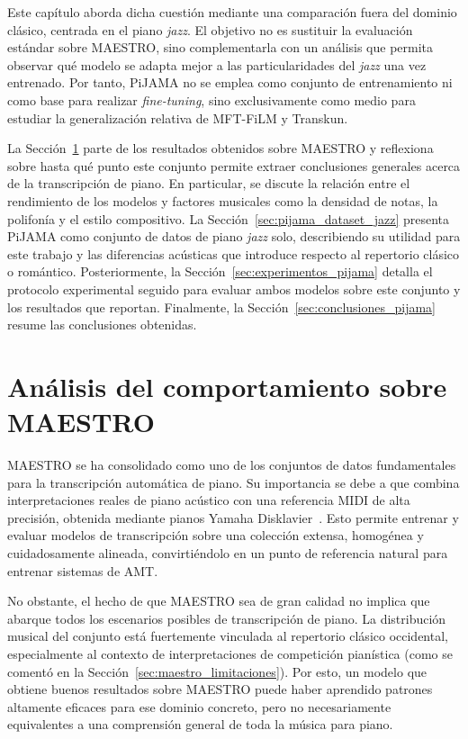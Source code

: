 \documentclass[11pt,spanish,listoffigures,listoftables]{tfgetsinf}
\begin{document}
Este capítulo aborda dicha cuestión mediante una comparación fuera del dominio
clásico, centrada en el piano \textit{jazz}. El objetivo no es sustituir la evaluación estándar
sobre MAESTRO, sino complementarla con un análisis que permita observar qué modelo
se adapta mejor a las particularidades del \textit{jazz} una vez entrenado. Por tanto, PiJAMA no
se emplea como conjunto de entrenamiento ni como base para realizar \textit{fine-tuning},
sino exclusivamente como medio para estudiar la generalización relativa de
MFT-FiLM y Transkun.

La Sección~\ref{sec:maestro_generalizacion_jazz} parte de los resultados obtenidos
sobre MAESTRO y reflexiona sobre hasta qué punto este conjunto permite extraer
conclusiones generales acerca de la transcripción de piano. En particular, se discute la
relación entre el rendimiento de los modelos y factores musicales como la densidad de
notas, la polifonía y el estilo compositivo. La Sección~\ref{sec:pijama_dataset_jazz}
presenta PiJAMA como conjunto de datos de piano \textit{jazz} solo, describiendo su utilidad
para este trabajo y las diferencias acústicas que introduce respecto al repertorio clásico
o romántico. Posteriormente, la Sección~\ref{sec:experimentos_pijama} detalla el
protocolo experimental seguido para evaluar ambos modelos sobre este conjunto y los resultados que reportan. Finalmente,  la
Sección~\ref{sec:conclusiones_pijama} resume las conclusiones obtenidas.


\section{Análisis del comportamiento sobre MAESTRO}
\label{sec:maestro_generalizacion_jazz}

MAESTRO se ha consolidado como uno de los conjuntos de datos fundamentales para
la transcripción automática de piano. Su importancia se debe a que combina
interpretaciones reales de piano acústico con una referencia MIDI de alta precisión,
obtenida mediante pianos Yamaha Disklavier~\cite{hawthorne2019maestro,
magenta2020maestrov3}. Esto permite entrenar y evaluar modelos de transcripción
sobre una colección extensa, homogénea y cuidadosamente alineada, convirtiéndolo en
un punto de referencia natural para entrenar sistemas de AMT.

No obstante, el hecho de que MAESTRO sea de gran calidad no implica que abarque 
todos los escenarios posibles de transcripción de piano. La distribución musical
del conjunto está fuertemente vinculada al repertorio clásico occidental, especialmente
al contexto de interpretaciones de competición pianística (como se comentó en la Sección~\ref{sec:maestro_limitaciones}).
Por esto, un modelo que
obtiene buenos resultados sobre MAESTRO puede haber aprendido patrones altamente
eficaces para ese dominio concreto, pero no necesariamente equivalentes a una
comprensión general de toda la música para piano.
\end{document}
